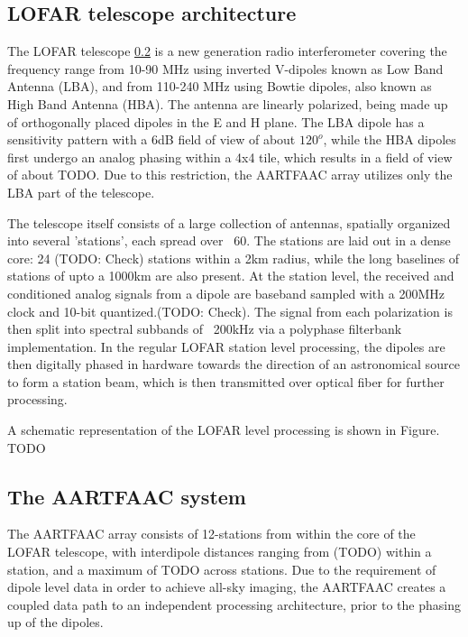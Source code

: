 \documentclass{aa}
\begin{document}
\subsection {\label{subsec:lofar} LOFAR telescope architecture}
The LOFAR telescope \ref{} is a new generation radio interferometer covering the
frequency  range from  10-90  MHz using  inverted V-dipoles  known  as Low  Band
Antenna (LBA),  and from 110-240  MHz using Bowtie  dipoles, also known  as High
Band  Antenna (HBA).   The  antenna are  linearly polarized,  being  made up  of
orthogonally  placed  dipoles in  the  E  and H  plane.  The  LBA dipole  has  a
sensitivity pattern  with a 6dB  field of view of  about $120^o$, while  the HBA
dipoles first undergo  an analog phasing within  a 4x4 tile, which  results in a
field  of view  of  about TODO.  Due  to this  restriction,  the AARTFAAC  array
utilizes only the LBA part of the telescope.

The  telescope itself  consists of  a  large collection  of antennas,  spatially
organized into several  'stations', each spread over ~60. The  stations are laid
out in a  dense core: 24 (TODO:  Check) stations within a 2km  radius, while the
long baselines  of stations of  upto a 1000km are  also present. At  the station
level, the  received and conditioned analog  signals from a dipole  are baseband
sampled with a 200MHz clock and  10-bit quantized.(TODO: Check). The signal from
each  polarization  is then  split  into  spectral  subbands  of ~200kHz  via  a
polyphase  filterbank  implementation.   In  the  regular  LOFAR  station  level
processing,  the dipoles  are  then  digitally phased  in  hardware towards  the
direction  of an  astronomical source  to  form a  station beam,  which is  then
transmitted over optical fiber for further processing.

A  schematic  representation   of  the  LOFAR  level  processing   is  shown  in
Figure. TODO

\subsection {\label{subsec:aartfaac}  The AARTFAAC system}
The AARTFAAC  array consists of  12-stations from within  the core of  the LOFAR
telescope, with interdipole distances ranging  from (TODO) within a station, and
a maximum of TODO across stations.  Due  to the requirement of dipole level data
in order to achieve all-sky imaging, the AARTFAAC creates a coupled data path to
an independent processing architecture, prior to the phasing up of the dipoles.
\end{document}
